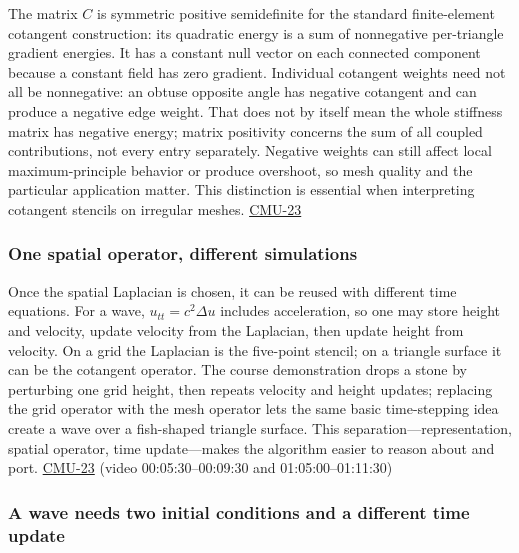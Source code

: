 The matrix \(C\) is symmetric positive semidefinite for the standard finite-element cotangent construction: its quadratic energy is a sum of nonnegative per-triangle gradient energies. It has a constant null vector on each connected component because a constant field has zero gradient. Individual cotangent weights need not all be nonnegative: an obtuse opposite angle has negative cotangent and can produce a negative edge weight. That does not by itself mean the whole stiffness matrix has negative energy; matrix positivity concerns the sum of all coupled contributions, not every entry separately. Negative weights can still affect local maximum-principle behavior or produce overshoot, so mesh quality and the particular application matter. This distinction is essential when interpreting cotangent stencils on irregular meshes. \hyperref[04-visual-computing-ii-ch036-cmu-23---physically-based-animation-and-pdes]{CMU-23}

\subsubsection{One spatial operator, different simulations}\label{04-visual-computing-ii-ch030-one-spatial-operator-different-simulations}

Once the spatial Laplacian is chosen, it can be reused with different time equations. For a wave, \(u_{tt}=c^2\Delta u\) includes acceleration, so one may store height and velocity, update velocity from the Laplacian, then update height from velocity. On a grid the Laplacian is the five-point stencil; on a triangle surface it can be the cotangent operator. The course demonstration drops a stone by perturbing one grid height, then repeats velocity and height updates; replacing the grid operator with the mesh operator lets the same basic time-stepping idea create a wave over a fish-shaped triangle surface. This separation---representation, spatial operator, time update---makes the algorithm easier to reason about and port. \hyperref[04-visual-computing-ii-ch036-cmu-23---physically-based-animation-and-pdes]{CMU-23} (video 00:05:30--00:09:30 and 01:05:00--01:11:30)

\subsubsection{A wave needs two initial conditions and a different time update}\label{04-visual-computing-ii-ch030-a-wave-needs-two-initial-conditions-and-a-different-time-update}

